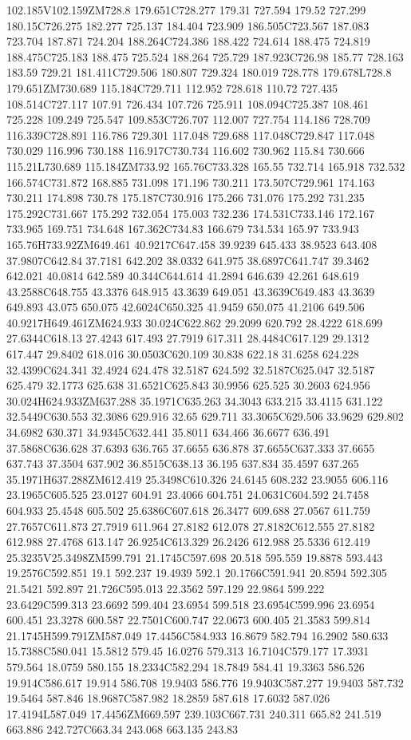 102.185V102.159ZM728.8 179.651C728.277 179.31 727.594 179.52 727.299 180.15C726.275 182.277 725.137 184.404 723.909 186.505C723.567 187.083 723.704 187.871 724.204 188.264C724.386 188.422 724.614 188.475 724.819 188.475C725.183 188.475 725.524 188.264 725.729 187.923C726.98 185.77 728.163 183.59 729.21 181.411C729.506 180.807 729.324 180.019 728.778 179.678L728.8 179.651ZM730.689 115.184C729.711 112.952 728.618 110.72 727.435 108.514C727.117 107.91 726.434 107.726 725.911 108.094C725.387 108.461 725.228 109.249 725.547 109.853C726.707 112.007 727.754 114.186 728.709 116.339C728.891 116.786 729.301 117.048 729.688 117.048C729.847 117.048 730.029 116.996 730.188 116.917C730.734 116.602 730.962 115.84 730.666 115.21L730.689 115.184ZM733.92 165.76C733.328 165.55 732.714 165.918 732.532 166.574C731.872 168.885 731.098 171.196 730.211 173.507C729.961 174.163 730.211 174.898 730.78 175.187C730.916 175.266 731.076 175.292 731.235 175.292C731.667 175.292 732.054 175.003 732.236 174.531C733.146 172.167 733.965 169.751 734.648 167.362C734.83 166.679 734.534 165.97 733.943 165.76H733.92ZM649.461 40.9217C647.458 39.9239 645.433 38.9523 643.408 37.9807C642.84 37.7181 642.202 38.0332 641.975 38.6897C641.747 39.3462 642.021 40.0814 642.589 40.344C644.614 41.2894 646.639 42.261 648.619 43.2588C648.755 43.3376 648.915 43.3639 649.051 43.3639C649.483 43.3639 649.893 43.075 650.075 42.6024C650.325 41.9459 650.075 41.2106 649.506 40.9217H649.461ZM624.933 30.024C622.862 29.2099 620.792 28.4222 618.699 27.6344C618.13 27.4243 617.493 27.7919 617.311 28.4484C617.129 29.1312 617.447 29.8402 618.016 30.0503C620.109 30.838 622.18 31.6258 624.228 32.4399C624.341 32.4924 624.478 32.5187 624.592 32.5187C625.047 32.5187 625.479 32.1773 625.638 31.6521C625.843 30.9956 625.525 30.2603 624.956 30.024H624.933ZM637.288 35.1971C635.263 34.3043 633.215 33.4115 631.122 32.5449C630.553 32.3086 629.916 32.65 629.711 33.3065C629.506 33.9629 629.802 34.6982 630.371 34.9345C632.441 35.8011 634.466 36.6677 636.491 37.5868C636.628 37.6393 636.765 37.6655 636.878 37.6655C637.333 37.6655 637.743 37.3504 637.902 36.8515C638.13 36.195 637.834 35.4597 637.265 35.1971H637.288ZM612.419 25.3498C610.326 24.6145 608.232 23.9055 606.116 23.1965C605.525 23.0127 604.91 23.4066 604.751 24.0631C604.592 24.7458 604.933 25.4548 605.502 25.6386C607.618 26.3477 609.688 27.0567 611.759 27.7657C611.873 27.7919 611.964 27.8182 612.078 27.8182C612.555 27.8182 612.988 27.4768 613.147 26.9254C613.329 26.2426 612.988 25.5336 612.419 25.3235V25.3498ZM599.791 21.1745C597.698 20.518 595.559 19.8878 593.443 19.2576C592.851 19.1 592.237 19.4939 592.1 20.1766C591.941 20.8594 592.305 21.5421 592.897 21.726C595.013 22.3562 597.129 22.9864 599.222 23.6429C599.313 23.6692 599.404 23.6954 599.518 23.6954C599.996 23.6954 600.451 23.3278 600.587 22.7501C600.747 22.0673 600.405 21.3583 599.814 21.1745H599.791ZM587.049 17.4456C584.933 16.8679 582.794 16.2902 580.633 15.7388C580.041 15.5812 579.45 16.0276 579.313 16.7104C579.177 17.3931 579.564 18.0759 580.155 18.2334C582.294 18.7849 584.41 19.3363 586.526 19.914C586.617 19.914 586.708 19.9403 586.776 19.9403C587.277 19.9403 587.732 19.5464 587.846 18.9687C587.982 18.2859 587.618 17.6032 587.026 17.4194L587.049 17.4456ZM669.597 239.103C667.731 240.311 665.82 241.519 663.886 242.727C663.34 243.068 663.135 243.83 